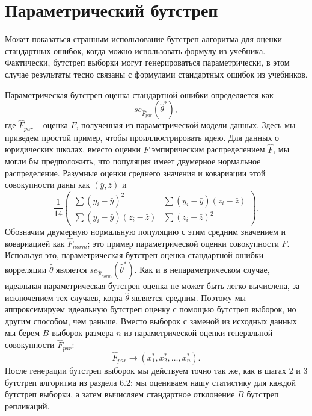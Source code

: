\section{Параметрический бутстреп}

Может показаться странным использование бутстреп алгоритма для оценки стандартных ошибок, когда можно использовать формулу из учебника. Фактически, бутстреп выборки могут генерироваться параметрически, в этом случае результаты тесно связаны с формулами стандартных ошибок из учебников. 

Параметрическая бутстреп оценка стандартной ошибки определяется как 
\begin{equation}
    se_{\hat F_{par}}(\hat\theta^*),
\end{equation}
где $\hat F_{par}$ -- оценка $F$, полученная из параметрической модели данных. Здесь мы приведем простой пример, чтобы проиллюстрировать идею. Для данных о юридических школах, вместо оценки $F$ эмпирическим распределением $\hat F$, мы могли бы предположить, что популяция имеет двумерное нормальное распределение. Разумные оценки среднего значения и ковариации этой совокупности даны как $(\bar y, \bar z)$ и
\begin{equation}
    \frac{1}{14}\left(
    \begin{array}{cc}
        \sum(y_i-\bar y)^2 & \sum(y_i-\bar y)(z_i-\bar z) \\
        \sum(y_i-\bar y)(z_i-\bar z) & \sum(z_i-\bar z)^2
    \end{array}
    \right).
\end{equation}
Обозначим двумерную нормальную популяцию с этим средним значением и ковариацией как $\hat F_{norm}$; это пример параметрической оценки совокупности $F$. Используя это, параметрическая бутстреп оценка стандартной ошибки корреляции $\hat\theta$ является $se_{\hat F_{norm}} (\hat\theta^*)$. Как и в непараметрическом случае, идеальная параметрическая бутстреп оценка не может быть легко вычислена, за исключением тех случаев, когда $\hat\theta$ является средним. Поэтому мы аппроксимируем идеальную бутстреп оценку с помощью бутстреп выборок, но другим способом, чем раньше. Вместо выборок с заменой из исходных данных мы берем $B$ выборок размера $n$ из параметрической оценки генеральной совокупности $\hat F_{par}$:
\begin{equation}
    \hat F_{par}\rightarrow(x_1^*,x_2^*,\ldots,x_n^*).
\end{equation}
После генерации бутстреп выборок мы действуем точно так же, как в шагах 2 и 3 бутстреп алгоритма из раздела 6.2: мы оцениваем нашу статистику для каждой бутстреп выборки, а затем вычисляем стандартное отклонение $B$ бутстреп репликаций.

